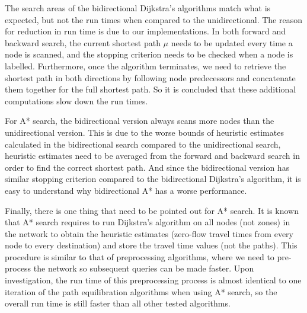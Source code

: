 The search areas of the bidirectional Dijkstra's algorithms match what is expected,
but not the run times when compared to the unidirectional.
The reason for reduction in run time is due to our implementations.
In both forward and backward search,
the current shortest path $\mu$ needs to be updated every time a node is scanned,
and the stopping criterion needs to be checked when a node is labelled.
Furthermore,
once the algorithm terminates,
we need to retrieve the shortest path in both directions by following node predecessors and concatenate them together for the full shortest path.
So it is concluded that these additional computations slow down the run times.

For A* search,
the bidirectional version always scans more nodes than the unidirectional version.
This is due to the worse bounds of  heuristic estimates calculated in the bidirectional search compared to the unidirectional search,
heuristic estimates need to be averaged from the forward and backward search in order to find the correct shortest path.
And since the bidirectional version has similar stopping criterion compared to the bidirectional Dijkstra's algorithm,
it is easy to understand why bidirectional A* has a worse performance.

Finally, there is one thing that need to be pointed out for A* search.
It is known that A* search requires to run Dijkstra's algorithm on all nodes (not zones) in the network to obtain the heuristic estimates (zero-flow travel times from every node to every destination) and store the travel time values (not the paths).
This procedure is similar to that of preprocessing algorithms,
where we need to pre-process the network so subsequent queries can be made faster.
Upon investigation, the run time of this preprocessing process is almost identical to one iteration of the path equilibration algorithms when using A* search,
so the overall run time is still faster than all other tested algorithms.

